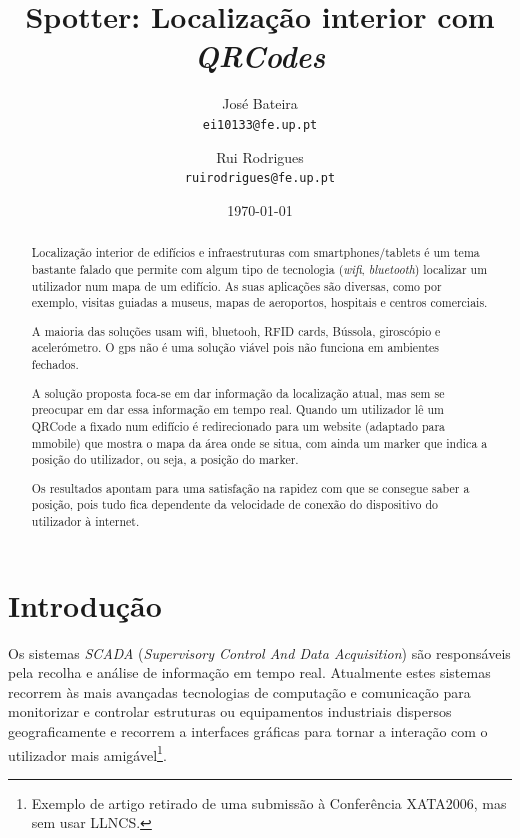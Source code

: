\documentclass[twocolumn,twoside,11pt]{article}
\title{\vspace{-15mm}\fontsize{24pt}{10pt}\selectfont\textbf{
  Spotter: Localização interior com \emph{QRCodes}
}} %
\author{José Bateira\\
\small \texttt{ei10133@fe.up.pt}\\
\and
Rui Rodrigues\\
\small \texttt{ruirodrigues@fe.up.pt}
\vspace{-5mm}
}
\date{\today}
\newcommand{\class}[1]{{\normalfont\slshape #1\/}}
\newcommand{\scada}{\class{SCADA}}
\begin{document}
\maketitle
\thispagestyle{plain}            %


\begin{abstract}
Localização interior de edifícios e infraestruturas com smartphones/tablets é um tema bastante falado que permite com algum tipo de tecnologia (\emph{wifi}, \emph{bluetooth}) localizar um utilizador num mapa de um edifício.
As suas aplicações são diversas, como por exemplo, visitas guiadas a museus, mapas de aeroportos, hospitais e centros comerciais.

A maioria das soluções usam wifi, bluetooh, RFID cards, Bússola, giroscópio e acelerómetro.
O gps não é uma solução viável pois não funciona em ambientes fechados.

A solução proposta foca-se em dar informação da localização atual, mas sem se preocupar em dar essa informação em tempo real. Quando um utilizador lê um QRCode a fixado num edifício é redirecionado para um website (adaptado para mmobile) que mostra o mapa da área onde se situa, com ainda um marker que indica a posição do utilizador, ou seja, a posição do marker.

Os resultados apontam para uma satisfação na rapidez com que se consegue saber a posição, pois tudo fica dependente da velocidade de conexão do dispositivo do utilizador à internet.
\end{abstract}


\section{Introdução}\label{sec:intro}

Os sistemas \scada{} (\emph{Supervisory Control And Data Acquisition})
são responsáveis pela recolha e análise de informação em tempo real.
Atualmente estes sistemas recorrem às mais avançadas tecnologias de
computação e comunicação para monitorizar e controlar estruturas ou
equipamentos industriais dispersos geograficamente e recorrem a
interfaces gráficas para tornar a interação com o utilizador mais
amigável\footnote{Exemplo de artigo retirado de uma submissão à
  Conferência XATA2006, mas sem usar LLNCS.}.
\end{document}

